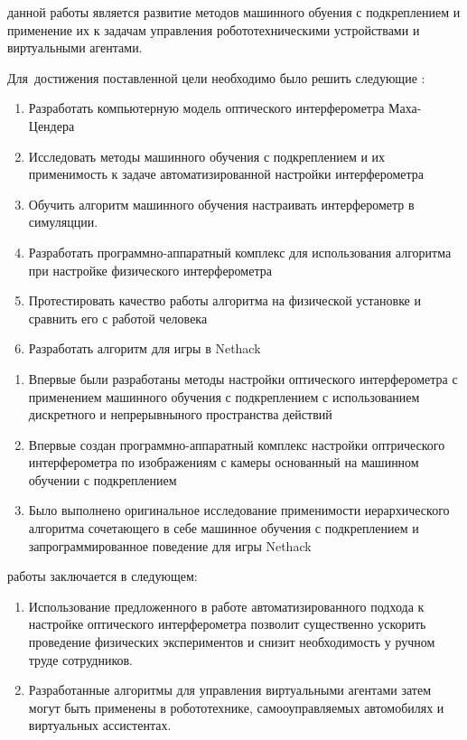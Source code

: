 
{\aim} данной работы является развитие методов машинного обуения с подкреплением и применение их к задачам управления робототехническими устройствами и виртуальными агентами. 

Для~достижения поставленной цели необходимо было решить следующие {\tasks}:
\begin{enumerate}[beginpenalty=10000] %
  \item Разработать компьютерную модель оптического интерферометра Маха-Цендера
  \item Исследовать методы машинного обучения с подкреплением и их применимость к задаче автоматизированной настройки интерферометра
  \item Обучить алгоритм машинного обучения настраивать интерферометр в симуляцции. 
  \item Разработать программно-аппаратный комплекс для использования алгоритма при настройке физического интерферометра
  \item Протестировать качество работы алгоритма на физической установке и сравнить его с работой человека
  \item Разработать алгоритм для игры в Nethack
\end{enumerate}


{\novelty}
\begin{enumerate}[beginpenalty=10000] %
  \item Впервые были разработаны методы настройки оптического интерферометра с применением машинного обучения с подкреплением с использованием дискретного и непрерывныного пространства действий
  \item Впервые создан программно-аппаратный комплекс настройки оптрического интерферометра по изображениям с камеры основанный на машинном обучении с подкреплением
  \item Было выполнено оригинальное исследование применимости иерархического алгоритма сочетающего в себе машинное обучения с подкреплением и запрограммированное поведение для игры Nethack
\end{enumerate}

{\influence} работы заключается в следующем:
\begin{enumerate}[beginpenalty=10000] %
  \item Использование предложенного в работе автоматизированного подхода к настройке оптического интерферометра позволит существенно ускорить проведение физических экспериментов и снизит необходимость у ручном труде сотрудников. 
  \item Разработанные алгоритмы для управления виртуальными агентами затем могут быть применены в робототехнике, самооуправляемых автомобилях и виртуальных ассистентах. 
\end{enumerate}

